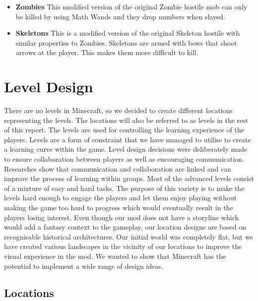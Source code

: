\begin{itemize}
\item \textbf{Zombies}
\newline
\normalsize This modified version of the original Zombie hostile mob can only be killed by using Math Wands and they drop numbers when slayed.

\item \textbf{Skeletons}
\newline
\normalsize This is a modified version of the original Skeleton hostile with similar properties to Zombies. Skeletons are armed with bows that shoot arrows at the player. This makes them more difficult to kill.
\newline
\end{itemize}

\section{Level Design}
There are no levels in Minecraft, so we decided to create different locations representing the levels. The locations will also be referred to as levels in the rest of this report. The levels are used for controlling the learning experience of the players. Levels are a form of constraint that we have managed to utilise to create a learning curve within the game.
\newline\newline
Level design decisions were deliberately made to ensure collaboration between players as well as encouraging communication. Researches show that communication and collaboration are linked and can improve the process of learning within groups.
Most of the advanced levels consist of a mixture of easy and hard tasks. The purpose of this variety is to make the levels hard enough to engage the players and let them enjoy playing without making the game too hard to progress which would eventually result in the players losing interest.
\newline\newline
Even though our mod does not have a storyline which would add a fantasy context to the gameplay, our location designs are based on recognisable historical architectures. Our initial world was completely flat, but we have created various landscapes in the vicinity of our locations to improve the visual experience in the mod. We wanted to show that Minecraft has the potential to implement a wide range of design ideas.

\subsection{Locations}

